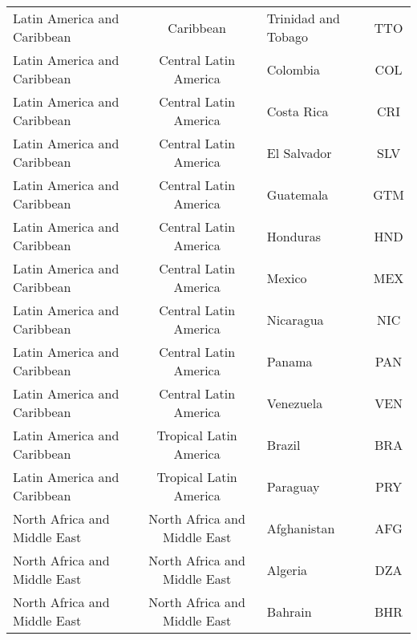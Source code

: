 \begin{landscape}
\begin{longtable}{|p{6cm}|c|p{5cm}|c|}
                      Latin America and Caribbean &                    Caribbean &                               Trinidad and Tobago &  TTO \\
                      Latin America and Caribbean &        Central Latin America &                                          Colombia &  COL \\
                      Latin America and Caribbean &        Central Latin America &                                        Costa Rica &  CRI \\
                      Latin America and Caribbean &        Central Latin America &                                       El Salvador &  SLV \\
                      Latin America and Caribbean &        Central Latin America &                                         Guatemala &  GTM \\
                      Latin America and Caribbean &        Central Latin America &                                          Honduras &  HND \\
                      Latin America and Caribbean &        Central Latin America &                                            Mexico &  MEX \\
                      Latin America and Caribbean &        Central Latin America &                                         Nicaragua &  NIC \\
                      Latin America and Caribbean &        Central Latin America &                                            Panama &  PAN \\
                      Latin America and Caribbean &        Central Latin America &                                         Venezuela &  VEN \\
                      Latin America and Caribbean &       Tropical Latin America &                                            Brazil &  BRA \\
                      Latin America and Caribbean &       Tropical Latin America &                                          Paraguay &  PRY \\
                     North Africa and Middle East &   North Africa and Middle East &                                       Afghanistan &  AFG \\
                     North Africa and Middle East &   North Africa and Middle East &                                           Algeria &  DZA \\
                     North Africa and Middle East &   North Africa and Middle East &                                           Bahrain &  BHR \\

\end{longtable}
\end{landscape}
